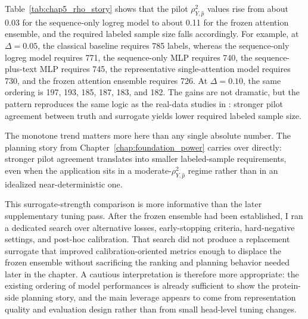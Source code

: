 
Table~\ref{tab:chap5_rho_story} shows that the pilot \(\rho_{Y,\hat p}^2\) values rise from about 0.03 for the sequence-only logreg model to about 0.11 for the frozen attention ensemble, and the required labeled sample size falls accordingly. For example, at \(\Delta = 0.05\), the classical baseline requires 785 labels, whereas the sequence-only logreg model requires 771, the sequence-only MLP requires 740, the sequence-plus-text MLP requires 745, the representative single-attention model requires 730, and the frozen attention ensemble requires 726. At \(\Delta = 0.10\), the same ordering is 197, 193, 185, 187, 183, and 182. The gains are not dramatic, but the pattern reproduces the same logic as the real-data studies in \textcite{ppi_power}: stronger pilot agreement between truth and surrogate yields lower required labeled sample size.

The monotone trend matters more here than any single absolute number. The planning story from Chapter~\ref{chap:foundation_power} carries over directly: stronger pilot agreement translates into smaller labeled-sample requirements, even when the application sits in a moderate-\(\rho_{Y,\hat p}^2\) regime rather than in an idealized near-deterministic one.

This surrogate-strength comparison is more informative than the later supplementary tuning pass. After the frozen ensemble had been established, I ran a dedicated search over alternative losses, early-stopping criteria, hard-negative settings, and post-hoc calibration. That search did not produce a replacement surrogate that improved calibration-oriented metrics enough to displace the frozen ensemble without sacrificing the ranking and planning behavior needed later in the chapter. A cautious interpretation is therefore more appropriate: the existing ordering of model performances is already sufficient to show the protein-side planning story, and the main leverage appears to come from representation quality and evaluation design rather than from small head-level tuning changes.



